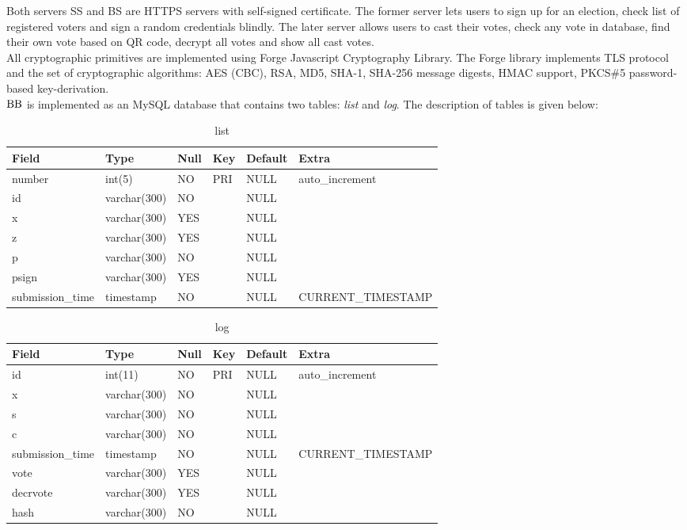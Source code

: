 Both servers SS and BS are HTTPS servers with self-signed certificate. The former server lets users to sign up for an election, check list of registered voters and sign a random credentials blindly. The later server allows users to cast their votes, check any vote in database, find their own vote based on QR code, decrypt all votes and show all cast votes.\\

All cryptographic primitives are implemented using Forge Javascript Cryptography Library. The Forge library implements TLS protocol and the set of cryptographic algorithms: AES (CBC), RSA, MD5, SHA-1, SHA-256 message digests, HMAC support, PKCS\#5 password-based key-derivation. \\

$\operatorname{BB}$ is implemented as an MySQL database that contains two tables: \textit{list} and \textit{log}. The description of tables is given below:\\

\begin{table}[h!]
\centering
\caption {list}
\begin{tabular}{|l|l|l|l|l|l|}
\hline
 Field & Type&     Null & Key & Default & Extra \\ 
 \hline 
 number &  int(5) & NO   & PRI  & NULL &  auto\_increment \\
id& varchar(300) & NO   &  &  NULL &\\
x& varchar(300) & YES  &  & NULL  & \\
z& varchar(300) & YES  &  & NULL  & \\
p& varchar(300) & NO  &  &  NULL & \\
psign&  varchar(300) & YES  &  & NULL  & \\
submission\_time& timestamp & NO  &  &  NULL & CURRENT\_TIMESTAMP\\
\hline
\end{tabular}
\end{table}
\begin{table}[!htb]
\centering
\caption {log}
\begin{tabular}{|l|l|l|l|l|l|}
\hline
 Field & Type&     Null & Key & Default & Extra \\ 
 \hline 
id &  int(11) & NO   & PRI  & NULL &  auto\_increment \\
x& varchar(300) & NO  &  & NULL  & \\
s& varchar(300) & NO  &  & NULL  & \\
c& varchar(300) & NO  &  & NULL  & \\
submission\_time& timestamp & NO  &  &  NULL & CURRENT\_TIMESTAMP\\
vote&  varchar(300) & YES  &  & NULL  & \\
decrvote&  varchar(300) & YES  &  & NULL  & \\
hash&  varchar(300) & NO  &  & NULL  & \\
\hline
\end{tabular}
\end{table}
